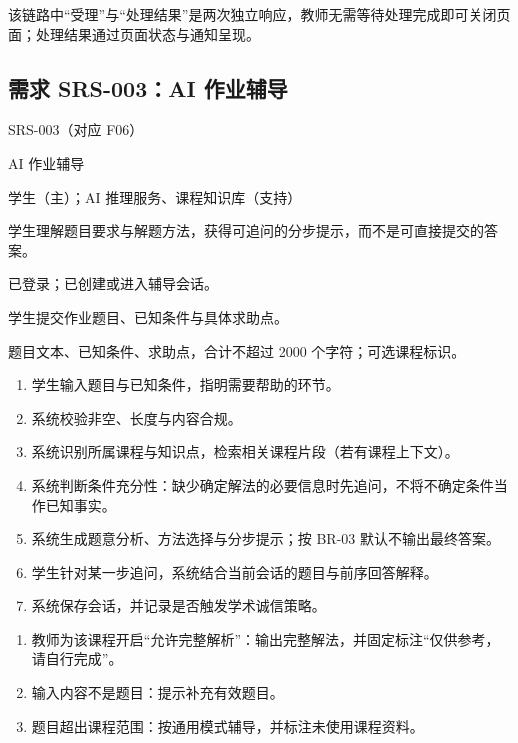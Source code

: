 \documentclass[12pt,a4paper]{ctexart}
\newenvironment{reqcard}
  {\begin{description}[leftmargin=6.2em,style=nextline,itemsep=4pt]}
  {\end{description}}
\begin{document}
该链路中“受理”与“处理结果”是两次独立响应，教师无需等待处理完成即可关闭页面；处理结果通过页面状态与通知呈现。

\subsection{需求 SRS-003：AI 作业辅导}
\label{srs-003}

\begin{reqcard}
  \item[编号] SRS-003（对应 F06）
  \item[名称] AI 作业辅导
  \item[参与者] 学生（主）；AI 推理服务、课程知识库（支持）
  \item[目标] 学生理解题目要求与解题方法，获得可追问的分步提示，而不是可直接提交的答案。
  \item[前置条件] 已登录；已创建或进入辅导会话。
  \item[触发] 学生提交作业题目、已知条件与具体求助点。
  \item[输入] 题目文本、已知条件、求助点，合计不超过 2000 个字符；可选课程标识。
  \item[主流程]
    \begin{enumerate}[label=M\arabic*,leftmargin=2.6em]
      \item 学生输入题目与已知条件，指明需要帮助的环节。
      \item 系统校验非空、长度与内容合规。
      \item 系统识别所属课程与知识点，检索相关课程片段（若有课程上下文）。
      \item 系统判断条件充分性：缺少确定解法的必要信息时先追问，不将不确定条件当作已知事实。
      \item 系统生成题意分析、方法选择与分步提示；按 BR-03 默认不输出最终答案。
      \item 学生针对某一步追问，系统结合当前会话的题目与前序回答解释。
      \item 系统保存会话，并记录是否触发学术诚信策略。
    \end{enumerate}
  \item[备选流]
    \begin{enumerate}[label=A\arabic*,leftmargin=2.6em]
      \item 教师为该课程开启“允许完整解析”：输出完整解法，并固定标注“仅供参考，请自行完成”。
      \item 输入内容不是题目：提示补充有效题目。
      \item 题目超出课程范围：按通用模式辅导，并标注未使用课程资料。
    \end{enumerate}

\end{reqcard}
\end{document}
